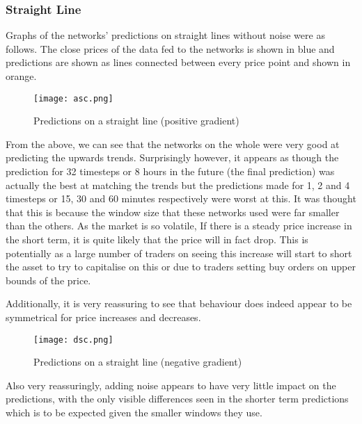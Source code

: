             \subsubsection{Straight Line}
            Graphs of the networks' predictions on straight lines without noise were as follows. The close prices of the data fed to the networks is shown in blue and predictions are shown as lines connected between every price point and shown in orange.

            \begin{figure}[htbp]
                \centering
                \texttt{[image: asc.png]}
                \caption{Predictions on a straight line (positive gradient)}
                \label{fig:asc}
            \end{figure}

            From the above, we can see that the networks on the whole were very good at predicting the upwards trends. Surprisingly however, it appears as though the prediction for 32 timesteps or 8 hours in the future (the final prediction) was actually the best at matching the trends but the predictions made for 1, 2 and 4 timesteps or 15, 30 and 60 minutes respectively were worst at this. It was thought that this is because the window size that these networks used were far smaller than the others. As the market is so volatile, If there is a steady price increase in the short term, it is quite likely that the price will in fact drop. This is potentially as a large number of traders on seeing this increase will start to short the asset to try to capitalise on this or due to traders setting buy orders on upper bounds of the price. 

            Additionally, it is very reassuring to see that behaviour does indeed appear to be symmetrical for price increases and decreases. 

            \begin{figure}[htbp]
                \centering
                \texttt{[image: dsc.png]}
                \caption{Predictions on a straight line (negative gradient)}
                \label{fig:dsc}
            \end{figure}

            Also very reassuringly, adding noise appears to have very little impact on the predictions, with the only visible differences seen in the shorter term predictions which is to be expected given the smaller windows they use. 

